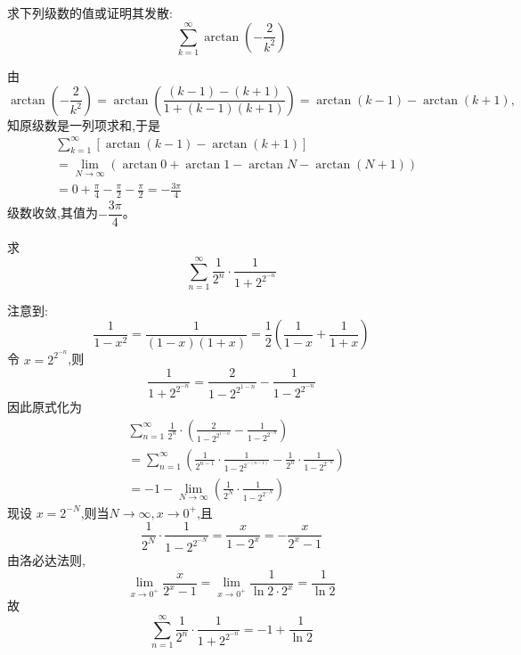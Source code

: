 \begin{questions}
    \question 求下列级数的值或证明其发散:
    \[
    \sum_{k=1}^{\infty} \arctan\left(-\frac{2}{k^{2}}\right)
    \]
    \begin{solution}
        由
        \[
        \arctan\left(-\frac{2}{k^{2}}\right)
        =\arctan\left(\frac{(k-1)-(k+1)}{1+(k-1)(k+1)}\right)
        =\arctan(k-1)-\arctan(k+1),
        \]
        知原级数是一列项求和,于是
        \begin{align*}
        &\sum_{k=1}^{\infty}\left[\arctan(k-1)-\arctan(k+1)\right] \\
        &=\lim_{N\to\infty}(\arctan 0+\arctan 1-\arctan N-\arctan(N+1)) \\
        &=0+\frac{\pi}{4}-\frac{\pi}{2}-\frac{\pi}{2} =-\frac{3\pi}{4}
        \end{align*}
        级数收敛,其值为$-\dfrac{3\pi}{4}$。
    \end{solution}

    \question 求
    \[
    \sum_{n=1}^{\infty} \frac{1}{2^n} \cdot \frac{1}{1 + 2^{2^{-n}}}
    \]
    \begin{solution}
        注意到:
        \[
        \frac{1}{1 - x^2} = \frac{1}{(1 - x)(1 + x)} = \frac{1}{2} \left( \frac{1}{1 - x} + \frac{1}{1 + x} \right)
        \]
        令 $x = 2^{2^{-n}}$,则
        \[
        \frac{1}{1 + 2^{2^{-n}}} = \frac{2}{1 - 2^{2^{1-n}}} - \frac{1}{1 - 2^{2^{-n}}}
        \]
        因此原式化为
        \begin{align*}
        &\sum_{n=1}^{\infty} \frac{1}{2^n} \cdot \left( \frac{2}{1 - 2^{2^{1-n}}} - \frac{1}{1 - 2^{2^{-n}}} \right)\\
        &= \sum_{n=1}^{\infty} \left( \frac{1}{2^{n-1}} \cdot \frac{1}{1 - 2^{2^{-(n-1)}}} - \frac{1}{2^n} \cdot \frac{1}{1 - 2^{2^{-n}}} \right)\\
        &= -1 - \lim_{N \to \infty} \left(\frac{1}{2^N} \cdot \frac{1}{1 - 2^{2^{-N}}} \right)
        \end{align*}
        现设 $x = 2^{-N}$,则当$N \to \infty, x \to 0^+$,且
        \[
        \frac{1}{2^N} \cdot \frac{1}{1 - 2^{2^{-N}}} = \frac{x}{1 - 2^x} = -\frac{x}{2^x - 1}
        \]        
        由洛必达法则,
        \[
        \lim_{x \to 0^+} \frac{x}{2^x - 1} = \lim_{x \to 0^+} \frac{1}{\ln 2 \cdot 2^x} = \frac{1}{\ln 2}
        \]
        故
        \[
        \sum_{n=1}^{\infty} \frac{1}{2^n} \cdot \frac{1}{1 + 2^{2^{-n}}} = -1 + \frac{1}{\ln 2}
        \]
    \end{solution}


\end{questions}
